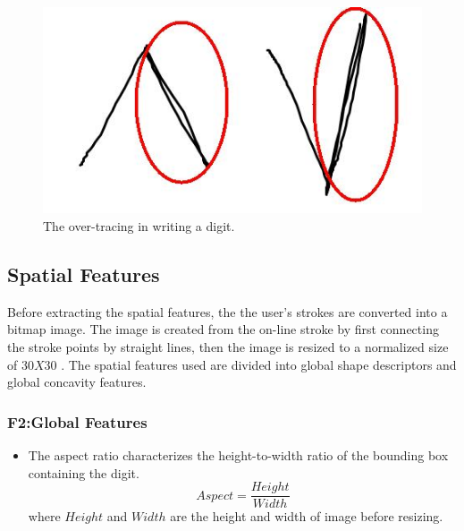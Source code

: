 \documentclass[times, 10pt,twocolumn]{article}
\begin{document}
 \begin{figure}
	\centering
		\includegraphics[scale=0.21]{direction2.jpg}
	\caption[ Writing Direction] {The over-tracing in writing a digit.}
	\label{fig:direction2}
\end{figure}



\subsection{Spatial Features}
\label{sec:spatial}

Before extracting the spatial features, the the user's  strokes are converted into a bitmap image. The image is created from the on-line stroke by first connecting the stroke points by straight lines, then the image is resized to a normalized size of $30X30$ . The spatial features used are divided into global shape descriptors  and global concavity features.
\subsubsection{F2:Global Features}

\begin{itemize}
\item The aspect ratio characterizes the height-to-width ratio of the bounding box containing the digit.
\[
    Aspect=\frac{Height}{Width}
\]
where $Height$ and $Width$ are the height and width of image before resizing.



\end{itemize}
\end{document}
